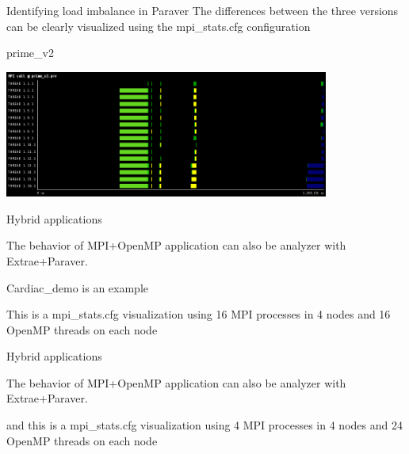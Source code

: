 \documentclass[10pt,xcolor=table]{beamer}
\begin{document}
\begin{frame}{Identifying load imbalance in Paraver}
The differences between the three versions can be clearly visualized using the mpi\_stats.cfg configuration

\centering
prime\_v2

\includegraphics[width=0.8\textwidth]{figs/MPI_call@prime_v2.png}

    
\end{frame}


\begin{frame}{Hybrid applications}

The behavior of MPI+OpenMP application can also be analyzer with Extrae+Paraver.

Cardiac\_demo is an example

This is a mpi\_stats.cfg visualization using 16 MPI processes in 4 nodes and 16 OpenMP threads on each node
    
\end{frame}

\begin{frame}{Hybrid applications}

The behavior of MPI+OpenMP application can also be analyzer with Extrae+Paraver.

and this is a mpi\_stats.cfg visualization using 4 MPI processes in 4 nodes and 24 OpenMP threads on each node
    
\end{frame}
\end{document}
